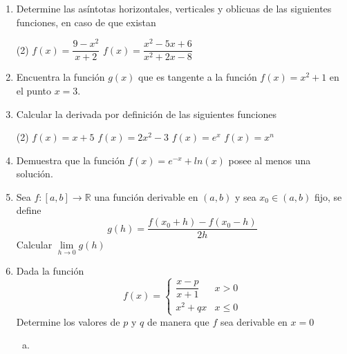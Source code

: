 \documentclass[12pt]{article}
\newenvironment{preguntas}
{\begin{enumerate}\itemsep12pt
	}
	{
	\end{enumerate}
}
\newcommand{\ra}{\rightarrow}
\newcommand{\R}{\mathbb{R}}
\begin{document}
\begin{preguntas}
\item Determine las asíntotas horizontales, verticales y oblicuas de las siguientes funciones, en caso de que existan
\begin{tasks}(2)
\task $f(x) = \dfrac{9-x^2}{x+2}$
\task $f(x) = \dfrac{x^2-5x+6}{x^2+2x-8}$
\end{tasks}
\item Encuentra la función $g(x)$ que es tangente a la función $f(x) = x^2 + 1$ en el punto $x = 3$.
\item Calcular la derivada por definición de las siguientes funciones
\begin{tasks}(2)
\task $f(x) = x+5$
\task $f(x) = 2x^2-3$
\task $f(x) = e^x$
\task $f(x) = x^n$
\end{tasks}
\item Demuestra que la función $f(x) = e^{-x} + ln(x)$ posee al menos una solución.
\item Sea $f:[a,b] \ra \R$ una función derivable en $(a,b)$ y sea $x_0 \in (a,b)$ fijo, se define
$$ g(h) = \dfrac{f(x_0 + h) - f(x_0-h)}{2h}$$
Calcular $\lim\limits_{h \ra 0} g(h)$
\item Dada la función
$$f(x) = \begin{cases}
\dfrac{x-p}{x+1} & x > 0\\
x^2+qx & x \leq 0
\end{cases}$$
Determine los valores de $p$ y $q$ de manera que $f$ sea derivable en $x=0$
\begin{enumerate}[a)]
\item 
\end{enumerate}
\end{preguntas}
\end{document}
